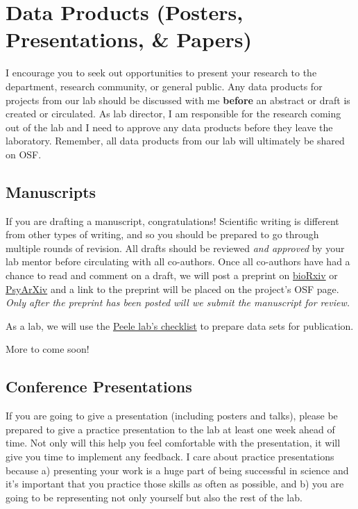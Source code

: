 \documentclass[]{book}
\begin{document}
\hypertarget{data-products-posters-presentations-papers}{%
\section{Data Products (Posters, Presentations, \& Papers)}\label{data-products-posters-presentations-papers}}

I encourage you to seek out opportunities to present your research to the department, research community, or general public. Any data products for projects from our lab should be discussed with me \textbf{before} an abstract or draft is created or circulated. As lab director, I am responsible for the research coming out of the lab and I need to approve any data products before they leave the laboratory. Remember, all data products from our lab will ultimately be shared on OSF.

\hypertarget{manuscripts}{%
\subsection{Manuscripts}\label{manuscripts}}

If you are drafting a manuscript, congratulations! Scientific writing is different from other types of writing, and so you should be prepared to go through multiple rounds of revision. All drafts should be reviewed \emph{and approved} by your lab mentor before circulating with all co-authors. Once all co-authors have had a chance to read and comment on a draft, we will post a preprint on \href{https://www.biorxiv.org/}{bioRxiv} or \href{https://psyarxiv.com/}{PsyArXiv} and a link to the preprint will be placed on the project's OSF page. \emph{Only after the preprint has been posted will we submit the manuscript for review.}

As a lab, we will use the \href{https://github.com/jpeelle/paperchecklist/blob/master/checklist.pdf}{Peele lab's checklist} to prepare data sets for publication.

More to come soon!

\hypertarget{conference-presentations}{%
\subsection{Conference Presentations}\label{conference-presentations}}

If you are going to give a presentation (including posters and talks), please be prepared to give a practice presentation to the lab at least one week ahead of time. Not only will this help you feel comfortable with the presentation, it will give you time to implement any feedback. I care about practice presentations because a) presenting your work is a huge part of being successful in science and it's important that you practice those skills as often as possible, and b) you are going to be representing not only yourself but also the rest of the lab.
\end{document}
